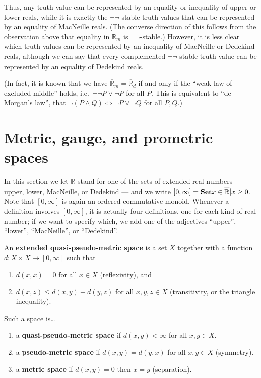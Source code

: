 \documentclass{article}
\def\R{\mathbb{R}}
\def\Re{\overline{\R}}
\def\Rp{[0,\infty]}
\def\Red{\Re_d}
\def\Rem{\Re_m}
\def\nn{\ensuremath{\neg\neg}}
\begin{document}
Thus, any truth value can be represented by an equality or inequality of upper or lower reals, while it is exactly the \nn-stable truth values that can be represented by an equality of MacNeille reals.
(The converse direction of this follows from the observation above that equality in $\Rem$ is \nn-stable.)
However, it is less clear which truth values can be represented by an inequality of MacNeille or Dedekind reals, although we can say that every complemented \nn-stable truth value can be represented by an equality of Dedekind reals.

(In fact, it is known that we have $\Rem = \Red$ if and only if the ``weak law of excluded middle'' holds, i.e.\ $\neg\neg P \lor \neg P$ for all $P$.
This is equivalent to ``de Morgan's law'', that $\neg (P\land Q) \iff \neg P \lor \neg Q$ for all $P,Q$.)


\section{Metric, gauge, and prometric spaces}
\label{sec:metric}

In this section we let $\Re$ stand for one of the sets of extended real numbers --- upper, lower, MacNeille, or Dedekind --- and we write $\Rp = \setof{x\in \Re | x \ge 0 }$.
Note that $\Rp$ is again an ordered commutative monoid.
Whenever a definition involves $\Rp$, it is actually four definitions, one for each kind of real number; if we want to specify which, we add one of the adjectives ``upper'', ``lower'', ``MacNeille'', or ``Dedekind''.

\begin{defn}
  An \textbf{extended quasi-pseudo-metric space} is a set $X$ together with a function $d:X\times X \to \Rp$ such that
  \begin{enumerate}
  \item $d(x,x)=0$ for all $x\in X$ (reflexivity), and
  \item $d(x,z)\le d(x,y)+d(y,z)$ for all $x,y,z\in X$ (transitivity, or the triangle inequality).
  \end{enumerate}
  Such a space is\dots
  \begin{enumerate}[resume]
  \item a \textbf{quasi-pseudo-metric space} if $d(x,y)<\infty$ for all $x,y\in X$.
  \item a \textbf{pseudo-metric space} if $d(x,y)=d(y,x)$ for all $x,y\in X$ (symmetry).
  \item a \textbf{metric space} if $d(x,y)=0$ then $x=y$ (separation).
  \end{enumerate}
\end{defn}
\end{document}
